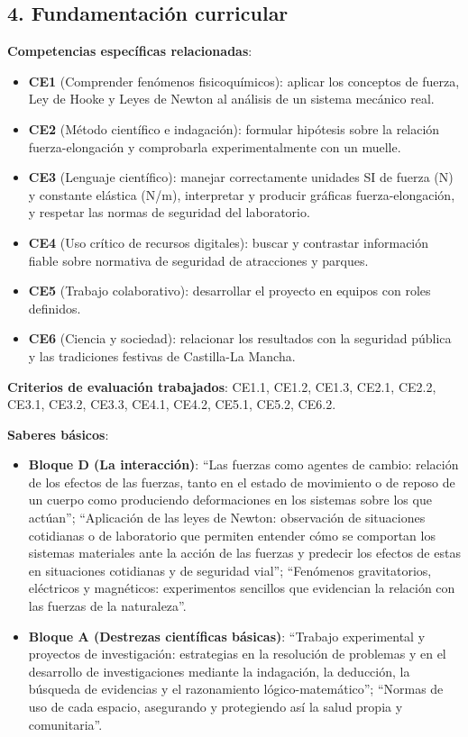 \documentclass[11pt,a4paper]{article}
\begin{document}
\subsection*{4. Fundamentación curricular}
\textbf{Competencias específicas relacionadas}:
\begin{itemize}
    \item \textbf{CE1} (Comprender fenómenos fisicoquímicos): aplicar los conceptos de fuerza, Ley de Hooke y Leyes de Newton al análisis de un sistema mecánico real.
    \item \textbf{CE2} (Método científico e indagación): formular hipótesis sobre la relación fuerza-elongación y comprobarla experimentalmente con un muelle.
    \item \textbf{CE3} (Lenguaje científico): manejar correctamente unidades SI de fuerza (N) y constante elástica (N/m), interpretar y producir gráficas fuerza-elongación, y respetar las normas de seguridad del laboratorio.
    \item \textbf{CE4} (Uso crítico de recursos digitales): buscar y contrastar información fiable sobre normativa de seguridad de atracciones y parques.
    \item \textbf{CE5} (Trabajo colaborativo): desarrollar el proyecto en equipos con roles definidos.
    \item \textbf{CE6} (Ciencia y sociedad): relacionar los resultados con la seguridad pública y las tradiciones festivas de Castilla-La Mancha.
\end{itemize}

\textbf{Criterios de evaluación trabajados}: CE1.1, CE1.2, CE1.3, CE2.1, CE2.2, CE3.1, CE3.2, CE3.3, CE4.1, CE4.2, CE5.1, CE5.2, CE6.2.

\textbf{Saberes básicos}:
\begin{itemize}
    \item \textbf{Bloque D (La interacción)}: ``Las fuerzas como agentes de cambio: relación de los efectos de las fuerzas, tanto en el estado de movimiento o de reposo de un cuerpo como produciendo deformaciones en los sistemas sobre los que actúan''; ``Aplicación de las leyes de Newton: observación de situaciones cotidianas o de laboratorio que permiten entender cómo se comportan los sistemas materiales ante la acción de las fuerzas y predecir los efectos de estas en situaciones cotidianas y de seguridad vial''; ``Fenómenos gravitatorios, eléctricos y magnéticos: experimentos sencillos que evidencian la relación con las fuerzas de la naturaleza''.
    \item \textbf{Bloque A (Destrezas científicas básicas)}: ``Trabajo experimental y proyectos de investigación: estrategias en la resolución de problemas y en el desarrollo de investigaciones mediante la indagación, la deducción, la búsqueda de evidencias y el razonamiento lógico-matemático''; ``Normas de uso de cada espacio, asegurando y protegiendo así la salud propia y comunitaria''.
\end{itemize}
\end{document}
